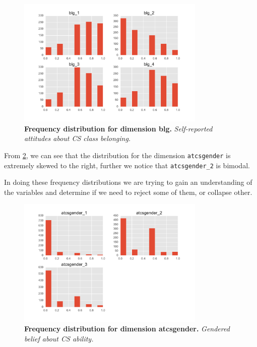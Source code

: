 \begin{figure}[!hbtp]
\centering
    \includegraphics[width=0.8\textwidth]{figures/blg_dimension}
    \caption{\textbf{Frequency distribution for dimension blg. }\textit{Self-reported attitudes about CS class belonging.}}\label{blg_dimension}
\end{figure}

From \ref{atcsgender_dimension}, we can see that the distribution for the dimension \texttt{atcsgender} is extremely skewed to the right, further we notice that \texttt{atcsgender\_2} is bimodal. 

In doing these frequency distributions we are trying to gain an understanding of the variables and determine if we need to reject some of them, or collapse other.


\begin{figure}[!hbtp]
\centering
    \includegraphics[width=0.8\textwidth]{figures/atcsgender_dimension}
    \caption{\textbf{Frequency distribution for dimension atcsgender. }\textit{Gendered belief about CS ability.}}\label{atcsgender_dimension}
\end{figure}

